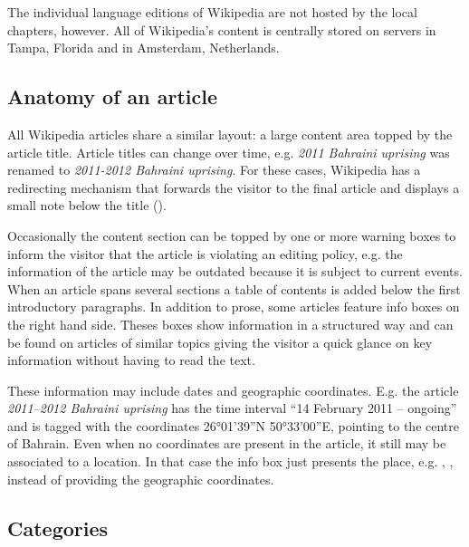 The individual language editions of Wikipedia are not hosted by the local chapters, however.
All of Wikipedia's content is centrally stored on servers in Tampa, Florida and in Amsterdam, Netherlands.\cite{wmf}

\subsection{Anatomy of an article}\label{sub:article}

All Wikipedia articles share a similar layout: a large content area topped by the article title.
Article titles can change over time, e.g. \emph{2011 Bahraini uprising} was renamed to \emph{2011-2012 Bahraini uprising}. 
For these cases, Wikipedia has a redirecting mechanism that forwards the visitor to the final article and displays a small note below the title ().


Occasionally the content section can be topped by one or more warning boxes to inform the visitor that the article is violating an editing policy, e.g. the information of the article may be outdated because it is subject to current events.
When an article spans several sections a table of contents is added below the first introductory paragraphs.
In addition to prose, some articles feature info boxes on the right hand side.
Theses boxes show information in a structured way and can be found on articles of similar topics giving the visitor a quick glance on key information without having to read the text.

These information may include dates and geographic coordinates.
E.g. the article \emph{2011--2012 Bahraini uprising} has the time interval ``14 February 2011 – ongoing'' and is tagged with the coordinates 26°01'39''N 50°33'00''E, pointing to the centre of Bahrain.
Even when no coordinates are present in the article, it still may be associated to a location.
In that case the info box just presents the place, e.g. , , instead of providing the geographic coordinates. 

\subsection{Categories}\label{sub:categories}


